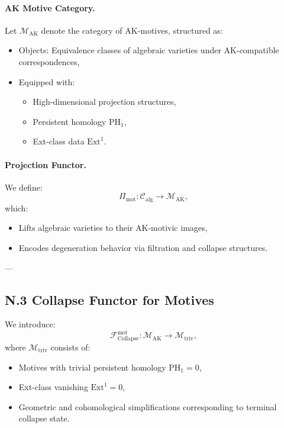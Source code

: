 \documentclass[11pt]{article}
\begin{document}
\paragraph{AK Motive Category.}
Let \( \mathcal{M}_{\mathrm{AK}} \) denote the category of AK-motives, structured as:
\begin{itemize}
  \item Objects: Equivalence classes of algebraic varieties under AK-compatible correspondences,
  \item Equipped with:
  \begin{itemize}
    \item High-dimensional projection structures,
    \item Persistent homology \( \mathrm{PH}_1 \),
    \item Ext-class data \( \mathrm{Ext}^1 \).
  \end{itemize}
\end{itemize}

\paragraph{Projection Functor.}
We define:
\[
\Pi_{\mathrm{mot}} : \mathcal{C}_{\mathrm{alg}} \longrightarrow \mathcal{M}_{\mathrm{AK}},
\]
which:
\begin{itemize}
  \item Lifts algebraic varieties to their AK-motivic images,
  \item Encodes degeneration behavior via filtration and collapse structures.
\end{itemize}

---

\subsection*{N.3 Collapse Functor for Motives}

We introduce:
\[
\mathcal{F}_{\mathrm{Collapse}}^{\mathrm{mot}} : \mathcal{M}_{\mathrm{AK}} \longrightarrow \mathcal{M}_{\mathrm{triv}},
\]
where \( \mathcal{M}_{\mathrm{triv}} \) consists of:
\begin{itemize}
  \item Motives with trivial persistent homology \( \mathrm{PH}_1 = 0 \),
  \item Ext-class vanishing \( \mathrm{Ext}^1 = 0 \),
  \item Geometric and cohomological simplifications corresponding to terminal collapse state.
\end{itemize}
\end{document}
